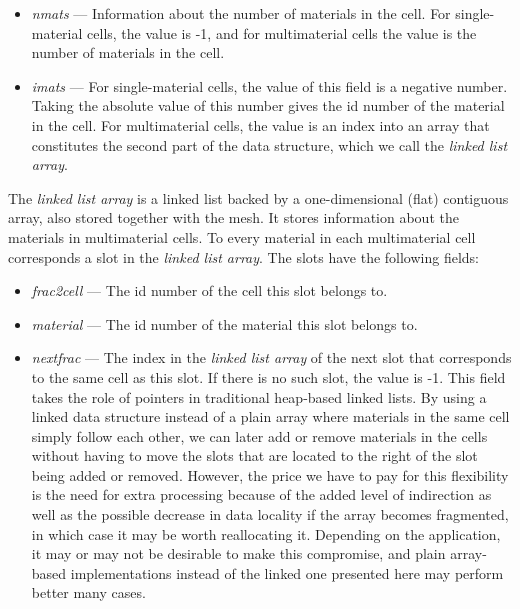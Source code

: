 \documentclass[fontsize=11pt, appendixprefix=true]{scrreprt}
\begin{document}
\begin{itemize}
  \item \textit{nmats} --- Information about the number of materials in the
    cell. For single-material cells, the value is -1, and for multimaterial
    cells the value is the number of materials in the cell.
  \item \textit{imats} --- For single-material cells, the value of this field is
    a negative number. Taking the absolute value of this number gives the id
    number of the material in the cell. For multimaterial cells, the value is an
    index into an array that constitutes the second part of the data
    structure, which we call the \textit{linked list array}.
\end{itemize}

The \textit{linked list array} is a linked list backed by a one-dimensional
(flat) contiguous array, also stored together with the mesh. It stores
information about the materials in multimaterial cells. To every material in
each multimaterial cell corresponds a slot in the \textit{linked list
  array}. The slots have the following fields:

\begin{itemize}
  \item \textit{frac2cell} --- The id number of the cell this slot belongs
    to.
  \item \textit{material} --- The id number of the material this slot belongs
    to.
  \item \textit{nextfrac} --- The index in the \textit{linked list array} of the
    next slot that corresponds to the same cell as this slot. If there is no
    such slot, the value is -1. This field takes the role of pointers in
    traditional heap-based linked lists. By using a linked data structure
    instead of a plain array where materials in the same cell simply follow each
    other, we can later add or remove materials in the cells without having to
    move the slots that are located to the right of the slot being added or
    removed. However, the price we have to pay for this flexibility is the need
    for extra processing because of the added level of indirection as well as
    the possible decrease in data locality if the array becomes fragmented, in
    which case it may be worth reallocating it. Depending on the application, it
    may or may not be desirable to make this compromise, and plain array-based
    implementations instead of the linked one presented here may perform better
    many cases.
\end{itemize}
\end{document}

